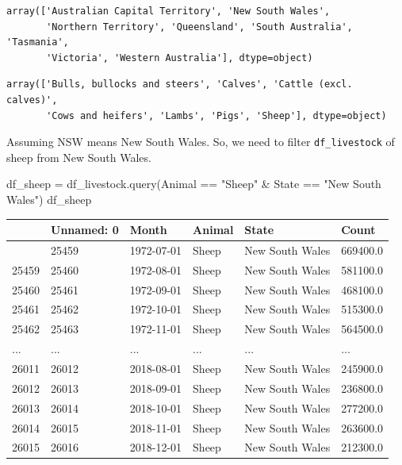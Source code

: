 \documentclass[
  11pt,
]{article}
\newenvironment{Shaded}{\begin{snugshade}}{\end{snugshade}}
\newcommand{\NormalTok}[1]{\textcolor[rgb]{0.00,0.23,0.31}{#1}}
\newcommand{\OperatorTok}[1]{\textcolor[rgb]{0.37,0.37,0.37}{#1}}
\newcommand{\StringTok}[1]{\textcolor[rgb]{0.13,0.47,0.30}{#1}}
\begin{document}
\begin{verbatim}
array(['Australian Capital Territory', 'New South Wales',
       'Northern Territory', 'Queensland', 'South Australia', 'Tasmania',
       'Victoria', 'Western Australia'], dtype=object)
\end{verbatim}

\begin{verbatim}
array(['Bulls, bullocks and steers', 'Calves', 'Cattle (excl. calves)',
       'Cows and heifers', 'Lambs', 'Pigs', 'Sheep'], dtype=object)
\end{verbatim}

Assuming NSW means New South Wales. So, we need to filter
\texttt{df\_livestock} of sheep from New South Wales.

\begin{Shaded}
\begin{Highlighting}[]
\NormalTok{df\_sheep }\OperatorTok{=}\NormalTok{ df\_livestock.query(}\StringTok{\textquotesingle{}Animal == "Sheep" \& State == "New South Wales"\textquotesingle{}}\NormalTok{)}
\NormalTok{df\_sheep}
\end{Highlighting}
\end{Shaded}

\begin{longtable}[]{@{}llllll@{}}
\toprule\noalign{}
& Unnamed: 0 & Month & Animal & State & Count \\
\midrule\noalign{}
\endhead
\bottomrule\noalign{}
\endlastfoot
25458 & 25459 & 1972-07-01 & Sheep & New South Wales & 669400.0 \\
25459 & 25460 & 1972-08-01 & Sheep & New South Wales & 581100.0 \\
25460 & 25461 & 1972-09-01 & Sheep & New South Wales & 468100.0 \\
25461 & 25462 & 1972-10-01 & Sheep & New South Wales & 515300.0 \\
25462 & 25463 & 1972-11-01 & Sheep & New South Wales & 564500.0 \\
... & ... & ... & ... & ... & ... \\
26011 & 26012 & 2018-08-01 & Sheep & New South Wales & 245900.0 \\
26012 & 26013 & 2018-09-01 & Sheep & New South Wales & 236800.0 \\
26013 & 26014 & 2018-10-01 & Sheep & New South Wales & 277200.0 \\
26014 & 26015 & 2018-11-01 & Sheep & New South Wales & 263600.0 \\
26015 & 26016 & 2018-12-01 & Sheep & New South Wales & 212300.0 \\
\end{longtable}
\end{document}
